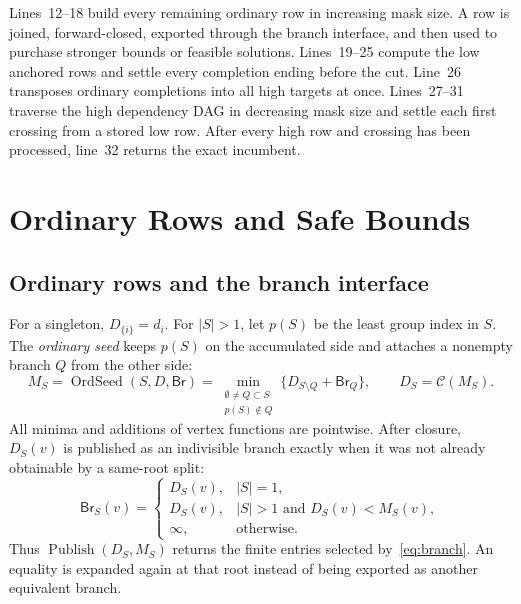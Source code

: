 \documentclass[sigconf,nonacm]{acmart}
\newcommand{\Clos}{\mathcal{C}}
\newcommand{\Br}{\mathsf{Br}}
\newcommand{\OrdSeed}{\operatorname{OrdSeed}}
\newcommand{\Publish}{\operatorname{Publish}}
\begin{document}
Lines~12--18 build every remaining ordinary row in increasing mask size.  A row is joined, forward-closed, exported through the branch interface, and then used to purchase stronger bounds or feasible solutions.  Lines~19--25 compute the low anchored rows and settle every completion ending before the cut.  Line~26 transposes ordinary completions into all high targets at once.  Lines~27--31 traverse the high dependency DAG in decreasing mask size and settle each first crossing from a stored low row.  After every high row and crossing has been processed, line~32 returns the exact incumbent.

\section{Ordinary Rows and Safe Bounds}
\label{sec:ordinary}

\subsection{Ordinary rows and the branch interface}
\label{sec:branch}

For a singleton, $D_{\{i\}}=d_i$.  For $|S|>1$, let $p(S)$ be the least group index in $S$.  The \emph{ordinary seed} keeps $p(S)$ on the accumulated side and attaches a nonempty branch $Q$ from the other side:
\begin{equation}
 M_S=\OrdSeed(S,D,\Br)=
 \min_{\substack{\emptyset\neq Q\subset S\\p(S)\notin Q}}
 \{D_{S\setminus Q}+\Br_Q\},\qquad D_S=\Clos(M_S).
 \label{eq:ordinary}
\end{equation}
All minima and additions of vertex functions are pointwise.  After closure, $D_S(v)$ is published as an indivisible branch exactly when it was not already obtainable by a same-root split:
\begin{equation}
 \Br_S(v)=
 \begin{cases}
 D_S(v),& |S|=1,\\
 D_S(v),& |S|>1\text{ and }D_S(v)<M_S(v),\\
 \infty,&\text{otherwise.}
 \end{cases}
 \label{eq:branch}
\end{equation}
Thus $\Publish(D_S,M_S)$ returns the finite entries selected by~\eqref{eq:branch}.  An equality is expanded again at that root instead of being exported as another equivalent branch.
\end{document}
